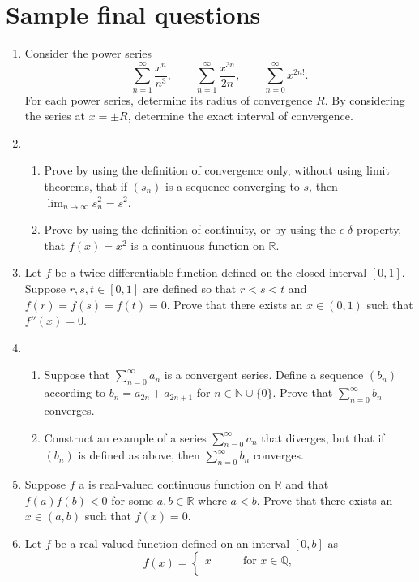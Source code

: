 \documentclass[12pt]{article}
\newcommand{\N}{\mathbb{N}}
\newcommand{\Q}{\mathbb{Q}}
\newcommand{\R}{\mathbb{R}}
\begin{document}
\section*{Sample final questions}
\begin{enumerate}
  \item Consider the power series
    \[
    \sum_{n=1}^\infty \frac{x^n}{n^3}, \qquad \sum_{n=1}^\infty \frac{x^{3n}}{2n}, \qquad \sum_{n=0}^\infty x^{2n!}.
    \]
    For each power series, determine its radius of convergence $R$. By
    considering the series at $x=\pm R$, determine the exact interval of
    convergence.
  \item
    \begin{enumerate}
      \item Prove by using the definition of convergence only, without using
	limit theorems, that if $(s_n)$ is a sequence converging to $s$, then
	$\lim_{n\to \infty} s_n^2 = s^2$.
      \item Prove by using the definition of continuity, or by using the
	$\epsilon$-$\delta$ property, that $f(x)=x^2$ is a continuous function
	on $\R$.
    \end{enumerate}
  \item Let $f$ be a twice differentiable function defined on the closed
    interval $[0,1]$. Suppose $r,s,t\in [0,1]$ are defined so that $r<s<t$ and
    $f(r)=f(s)=f(t)=0$. Prove that there exists an $x\in (0,1)$ such that
    $f''(x)=0$.
  \item
    \begin{enumerate}
      \item Suppose that $\sum_{n=0}^\infty a_n$ is a convergent series. Define
	a sequence $(b_n)$ according to $b_n=a_{2n}+a_{2n+1}$ for $n\in \N \cup
	\{0\}$. Prove that $\sum_{n=0}^\infty b_n$ converges.
      \item Construct an example of a series $\sum_{n=0}^\infty a_n$ that
	diverges, but that if $(b_n)$ is defined as above, then
	$\sum_{n=0}^\infty b_n$ converges.
    \end{enumerate}
  \item Suppose $f$ a is real-valued continuous function on $\R$ and that
    $f(a)f(b)<0$ for some $a,b\in \R$ where $a<b$. Prove that there exists an
    $x\in (a,b)$ such that $f(x)=0$.
  \item Let $f$ be a real-valued function defined on an interval $[0,b]$ as
    \[
    f(x) = \left\{
    \begin{array}{ll}
      x & \qquad \textrm{for $x\in \Q$,} \\

\end{array}\]
\end{enumerate}
\end{document}
